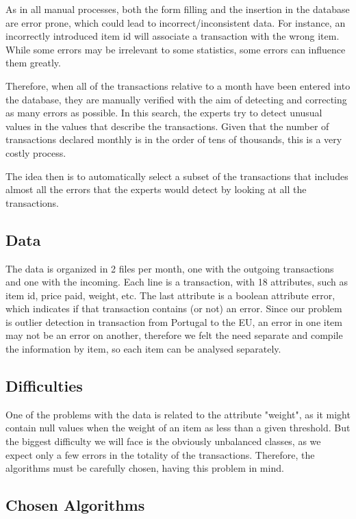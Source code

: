 \documentclass[12pt]{article}
\begin{document}
As in all manual processes, both the form filling and the insertion in the database are error prone, which could lead to incorrect/inconsistent data. For instance, an incorrectly introduced item id will associate a transaction with the wrong item. While some errors may be irrelevant to some statistics, some errors can influence them greatly.

Therefore, when all of the transactions relative to a month have been entered into the database, they are manually verified with the aim of detecting and correcting as many errors as possible. In this search, the experts try to detect unusual values in the values that describe the transactions.
Given that the number of transactions declared monthly is in the order of tens of thousands, this is a very costly process.

The idea then is to automatically select a subset of the transactions that includes almost all the errors that the experts would detect by looking at all the transactions.

\subsection{Data}
\label{subsec:data}
The data is organized in 2 files per month, one with the outgoing transactions and one with the incoming. Each line is a transaction, with 18 attributes, such as item id, price paid, weight, etc. The last attribute is a boolean attribute error, which indicates if that transaction contains (or not) an error.
Since our problem is outlier detection in transaction from Portugal to the EU, an error in one item may not be an error on another, therefore we felt the need separate and compile the information by item, so each item can be analysed separately.

\subsection{Difficulties}
\label{subsec:difficulties}

One of the problems with the data is related to the attribute "weight", as it might contain null values when the weight of an item as less than a given threshold. But the biggest difficulty we will face is the obviously unbalanced classes, as we expect only a few errors in the totality of the transactions. Therefore, the algorithms must be carefully chosen, having this problem in mind.

\subsection{Chosen Algorithms}
\label{subsec:algorithms}
\end{document}

